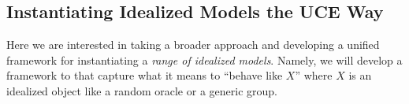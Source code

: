 {\begin{itemize}

\iffalse
\subsection{Instantiating Idealized Models the UCE Way}
 Here we are interested in taking a broader approach  and developing a unified framework for instantiating a \emph{range of  idealized models}. Namely, we will develop a framework to that capture what it means to ``behave like $X$'' where $X$ is an idealized object like a random oracle or a generic group. %


\end{itemize}}
